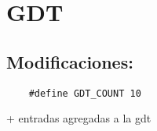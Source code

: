 
\section{GDT}
\subsection{Modificaciones:}




\begin{codesnippet}
\begin{verbatim}
    #define GDT_COUNT 10
\end{verbatim}
\end{codesnippet}


+ entradas agregadas a la gdt
